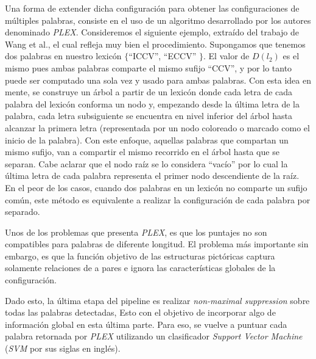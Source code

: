 	Una forma de extender dicha configuración para obtener las configuraciones de múltiples palabras, consiste en el uso de un algoritmo desarrollado por los autores denominado \textit{PLEX}. Consideremos el siguiente ejemplo, extraído del trabajo de Wang et al., el cual refleja muy bien el procedimiento. Supongamos que tenemos dos palabras en nuestro lexicón $\{$``ICCV'', ``ECCV'' $\}$. El valor de $D(l_2)$ es el mismo pues ambas palabras comparte el mismo sufijo ``CCV'', y por lo tanto puede ser computado una sola vez y usado para ambas palabras. Con esta idea en mente, se construye un árbol a partir de un lexicón donde cada letra de cada palabra del lexicón conforma un nodo y, empezando desde la última letra de la palabra, cada letra subsiguiente se encuentra en nivel inferior del árbol hasta alcanzar la primera letra (representada por un nodo coloreado o marcado como el inicio de la palabra). Con este enfoque, aquellas palabras que compartan un mismo sufijo, van a compartir el mismo recorrido en el árbol hasta que se separan. Cabe aclarar que el nodo raíz se lo considera ``vacío'' por lo cual la última letra de cada palabra representa el primer nodo descendiente de la raíz. En el peor de los casos, cuando dos palabras en un lexicón no comparte un sufijo común, este método es equivalente a realizar la configuración de cada palabra por separado.
	
	Unos de los problemas que presenta \textit{PLEX}, es que los puntajes no son compatibles para palabras de diferente longitud. El problema más importante sin embargo, es que la función objetivo de las estructuras pictóricas captura solamente relaciones de a pares e ignora las características globales de la configuración.
	
	Dado esto, la última etapa del pipeline es realizar \textit{non-maximal suppression} sobre todas las palabras detectadas, Esto con el objetivo de incorporar algo de información global en esta última parte. Para eso, se vuelve a puntuar cada palabra retornada por \textit{PLEX} utilizando un clasificador \textit{Support Vector Machine} (\textit{SVM} por sus siglas en inglés).
	